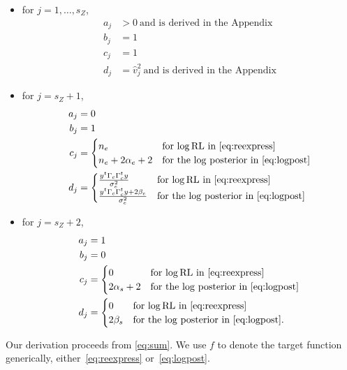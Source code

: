 \documentclass{report}
\newcommand{\RLorig}{\text{RL}}
\newcommand{\logRLorig}{\log\RLorig}
\newcommand{\sigesq}{\sigma_e^2}
\begin{document}
\begin{itemize}[label=---]
\item for $j = 1, \dots, s_Z$,
  \begin{align*}
    a_j &> 0\ \text{and is derived in the Appendix}\\
    b_j &=1\\
    c_j &=1\\
    d_j &= \hat v_j^2\ \text{and is derived in the Appendix}
  \end{align*}
\item for $j = s_Z +1$,
  \begin{align*}
    a_j &= 0\\
    b_j &= 1\\
    c_j &= \begin{cases}
                 n_e & \text{for $\logRLorig$ in \eqref{eq:reexpress}}\\
                 n_e + 2\alpha_e + 2 & \text{for the $\log$ posterior in \eqref{eq:logpost}}
              \end{cases}\\
    d_j &= \begin{cases}
                 \frac{y^t \Gamma_c \Gamma^t_c y}{\sigesq} & \text{for $\logRLorig$ in \eqref{eq:reexpress}}\\
                 \frac{y^t \Gamma_c \Gamma^t_c y + 2\beta_e}{\sigesq} & \text{for the $\log$ posterior in \eqref{eq:logpost}}
              \end{cases}
  \end{align*}
\item for $j = s_Z+2$,
  \begin{align*}
    a_j &= 1\\
    b_j &= 0\\
    c_j &= \begin{cases}
      0 & \text{for $\logRLorig$ in \eqref{eq:reexpress}}\\
      2 \alpha_s + 2 & \text{for the $\log$ posterior in \eqref{eq:logpost}}
    \end{cases}\\
    d_j &= \begin{cases}
      0 & \text{for $\logRLorig$ in \eqref{eq:reexpress}}\\
      2 \beta_s & \text{for the $\log$ posterior in \eqref{eq:logpost}}.
    \end{cases}
  \end{align*}
\end{itemize}
Our derivation proceeds from \eqref{eq:sum}.  We use $f$ to denote the target function generically, either~\eqref{eq:reexpress} or~\eqref{eq:logpost}.  
\end{document}
